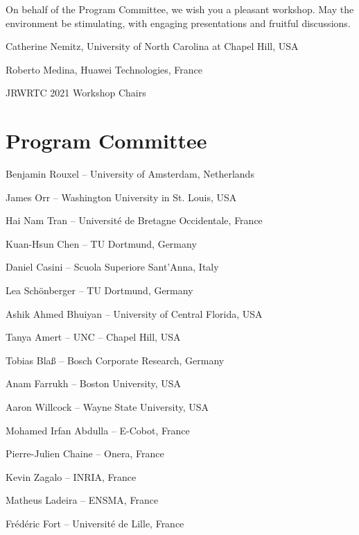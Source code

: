 \documentclass[10pt]{article}
\begin{document}
On behalf of the 
Program Committee, we wish you a pleasant workshop. May the environment be 
stimulating, with engaging presentations and fruitful discussions.

\begin{flushright}
	Catherine Nemitz, University of North Carolina at Chapel Hill, USA
	
	Roberto Medina, Huawei Technologies, France
	
	JRWRTC 2021 Workshop Chairs
\end{flushright}


\newpage

\section*{Program Committee}


\begin{center}
	Benjamin Rouxel – University of Amsterdam, Netherlands
	
	James Orr – Washington University in St. Louis, USA
	
	Hai Nam Tran – Université de Bretagne Occidentale, France
	
	Kuan-Hsun Chen – TU Dortmund, Germany
	
	Daniel Casini – Scuola Superiore Sant’Anna, Italy
	
	Lea Schönberger – TU Dortmund, Germany
	
	Ashik Ahmed Bhuiyan – University of Central Florida, USA
	
	Tanya Amert – UNC – Chapel Hill, USA
	
	Tobias Blaß – Bosch Corporate Research, Germany
	
	Anam Farrukh – Boston University, USA
	
	Aaron Willcock – Wayne State University, USA
	
	Mohamed Irfan Abdulla – E-Cobot, France
	
	Pierre-Julien Chaine – Onera, France
	
	Kevin Zagalo – INRIA, France
	
	Matheus Ladeira – ENSMA, France
	
	Frédéric Fort – Université de Lille, France
\end{center}
\vspace*{\fill}
\end{document}
